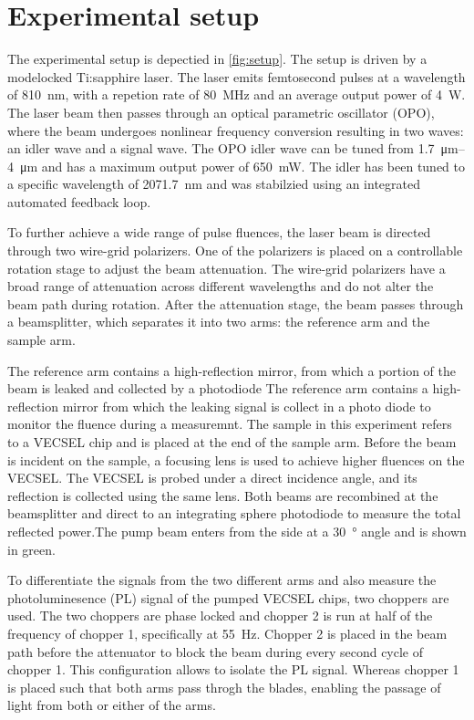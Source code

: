 \section{Experimental setup}\label{subsection:set-up}

The experimental setup is depectied in \cref{fig:setup}. The setup is driven by a modelocked Ti:sapphire laser. The laser emits femtosecond pulses at a wavelength of \qty{810}{\nm}, with a repetion rate of \qty{80}{\MHz} and an average output power of \qty{4}{\W}. The laser beam then passes through an optical parametric oscillator (OPO), where the beam undergoes nonlinear frequency conversion resulting in two waves: an idler wave and a signal wave. The OPO idler wave can be tuned from \qtyrange{1.7}{4}{\um} and has a maximum output power of \qty{650}{\mW}. The idler has been tuned to a specific wavelength of \qty{2071.7}{\nm} and was stabilzied using an integrated automated feedback loop.

To further achieve a wide range of pulse fluences, the laser beam is directed through two wire-grid polarizers. One of the polarizers is placed on a controllable rotation stage to adjust the beam attenuation. The wire-grid polarizers have a broad range of attenuation across different wavelengths and do not alter the beam path during rotation. After the attenuation stage, the beam passes through a beamsplitter, which separates it into two arms: the reference arm and the sample arm. 

The reference arm contains a high-reflection mirror, from which a portion of the beam is leaked and collected by a photodiode
The reference arm contains a high-reflection mirror from which the leaking signal is collect in a photo diode to monitor the fluence during a measuremnt. 
The sample in this experiment refers to a VECSEL chip and is placed at the end of the sample arm. Before the beam is incident on the sample, a focusing lens is used to achieve higher fluences on the VECSEL. The VECSEL is probed under a direct incidence angle, and its reflection is collected using the same lens. Both beams are recombined at the beamsplitter and direct to an integrating sphere photodiode to measure the total reflected power.The pump beam enters from the side at a \qty{30}{\degree} angle and is shown in green. 

To differentiate the signals from the two different arms and also measure the photoluminesence (PL) signal of the pumped VECSEL chips, two choppers are used. The two choppers are phase locked and chopper 2 is run at half of the frequency of chopper 1, specifically at \qty{55}{\Hz}. Chopper 2 is placed in the beam path before the attenuator to block the beam during every second cycle of chopper 1. This configuration allows to isolate the PL signal. Whereas chopper 1 is placed such that both arms pass throgh the blades, enabling the passage of light from both or either of the arms.

